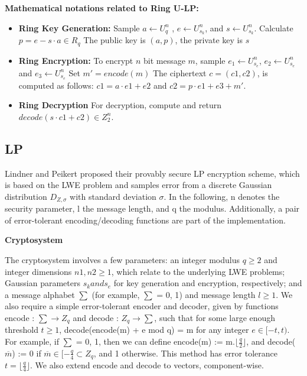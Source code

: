 \documentclass[conference]{IEEEtran}
\begin{document}
\textbf {Mathematical notations related to Ring U-LP:}

\begin{itemize}
    \item \textbf{Ring Key Generation:}
    Sample $a \leftarrow U_q^n$ , $e \leftarrow U_{s_k}^n$, and $s \leftarrow U_{s_k}^n$. Calculate $p=e-s·a \in  R_q$
The public key is $(a, p)$, the private key is $s$
\item \textbf{Ring Encryption:}
To encrypt $n$ bit message $m$, sample $e_1 \leftarrow U_{s_e}^n$, $e_2 \leftarrow U_{s_e}^n$ and $e_3 \leftarrow U_{s_e}^n$
Set $m' = encode(m)$ The ciphertext $c=(c1, c2)$, is computed as follows: $c1=a·e1 + e2$ and
$c2 = p · e1 + e3 + m'$.
\item\textbf{Ring Decryption}
For decryption, compute and return $decode(s · c1 + c2) \in  Z_2^n$.
\end{itemize}

\subsection{LP}
Lindner and Peikert proposed their provably secure LP encryption scheme, which is based on the LWE problem and samples error from a discrete Gaussian distribution $D_{Z,\sigma}$ with standard deviation $\sigma$. In the following, n denotes the security parameter, l the message
length, and q the modulus. Additionally, a pair of error-tolerant encoding/decoding functions are part of the implementation.

\textbf{Cryptosystem}

The cryptosystem involves a few parameters: an integer modulus $q \geq 2$ and integer dimensions $n1, n2 \geq 1$, which relate to the underlying LWE problems; Gaussian parameters $s_k and s_e$ for key generation and encryption, respectively; and a message alphabet $\sum$ (for example, $\sum$ = {0, 1}) and message length $l \geq 1$. We also require a simple error-tolerant encoder and decoder, given by functions encode : $\sum \rightarrow Z_q$ and decode : $Z_q \rightarrow \sum$, such that for some large enough threshold $t \geq 1$, decode(encode(m) + e mod q) = m
for any integer $e \in [−t, t)$. For example, if $\sum$ = {0, 1}, then we can define encode(m) := m.$\lfloor \frac{q}{2} \rfloor$, and decode($\overline{m}$) := 0 if $\overline{m} \in \lbrack − \frac{q}{4} \subset Z_q$, and 1 otherwise. This method has error tolerance $t = \lfloor \frac{q}{4} \rfloor$. We also extend encode and decode to vectors, component-wise. 
\end{document}
